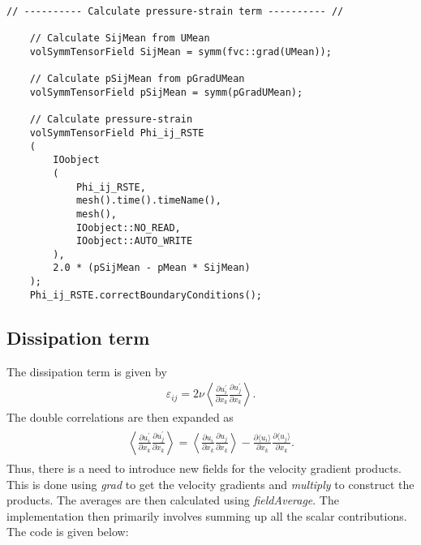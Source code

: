 \begin{lstlisting}[emph={ddt,div,laplacian}]
    // ---------- Calculate pressure-strain term ---------- //

    // Calculate SijMean from UMean
    volSymmTensorField SijMean = symm(fvc::grad(UMean));

    // Calculate pSijMean from pGradUMean
    volSymmTensorField pSijMean = symm(pGradUMean);

    // Calculate pressure-strain
    volSymmTensorField Phi_ij_RSTE
    (
        IOobject
        (
            Phi_ij_RSTE,
            mesh().time().timeName(),
            mesh(),
            IOobject::NO_READ,
            IOobject::AUTO_WRITE
        ),
        2.0 * (pSijMean - pMean * SijMean)
    );
    Phi_ij_RSTE.correctBoundaryConditions();
\end{lstlisting}

\subsection{Dissipation term}
\label{subsec:dissipation}

The dissipation term is given by
\begin{align}
    \varepsilon_{ij} = 2\nu \left\langle \frac{\partial u^{\prime}_i}{\partial x_k} \frac{\partial u^{\prime}_j}{\partial x_k} \right\rangle .
\end{align}
The double correlations are then expanded as
\begin{align}
    \begin{split}
            \left\langle \frac{\partial u^{\prime}_i}{\partial x_k} \frac{\partial u^{\prime}_j}{\partial x_k} \right\rangle
            =
            \left\langle \frac{\partial u_i}{\partial x_k} \frac{\partial u_j}{\partial x_k} \right\rangle
            -
            \frac{\partial \langle u_i \rangle}{\partial x_k} \frac{\partial \langle u_j \rangle}{\partial x_k} .
    \end{split}
\end{align}
Thus, there is a need to introduce new fields for the velocity gradient products. 
This is done using \emph{grad} to get the velocity gradients and \emph{multiply} to construct the products. The averages are then calculated using \emph{fieldAverage}.
The implementation then primarily involves summing up all the scalar contributions.
The \OF code is given below:

